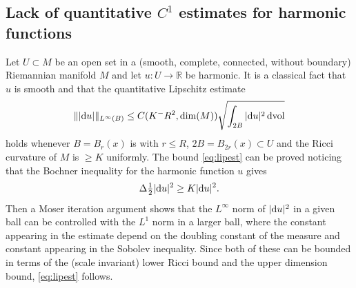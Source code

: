 \documentclass[11pt]{article}
\numberwithin{equation}{section}
\newcommand{\R}{\mathbb{R}}
\renewcommand{\d}{{\rm d}}
\begin{document}
\subsection{Lack of quantitative $C^1$ estimates for harmonic functions}
Let $U\subset M$ be an open set in a (smooth, complete, connected, without boundary) Riemannian manifold $M$ and let $u:U\to\R$ be harmonic. It is a classical fact that $u$ is smooth and that the quantitative Lipschitz estimate
\begin{equation}
\label{eq:lipest}
\||\d u|\|_{L^\infty(B)}\leq C(K^-R^2,{\rm dim}(M))\sqrt{\int_{2B}|\d u|^2\,\d{\rm vol}}
\end{equation}
holds whenever $B=B_r(x)$ is with $r\leq R$, $2B=B_{2r}(x)\subset U$ and the Ricci curvature of $M$ is $\geq K$ uniformly. The bound \eqref{eq:lipest} can be proved noticing that the Bochner inequality for the harmonic function $u$  gives
\[
\Delta\tfrac12|\d u|^2\geq K|\d u|^2.
\]
Then a Moser iteration argument shows that the $L^\infty$ norm of $|\d u|^2$ in a given ball can be controlled with the $L^1$ norm in  a larger ball, where the constant appearing in the estimate depend on the doubling constant of the measure and constant appearing in the Sobolev inequality. Since both of these can be bounded in terms of the (scale invariant) lower Ricci bound and the upper dimension bound, \eqref{eq:lipest} follows.

\bigskip
\end{document}
